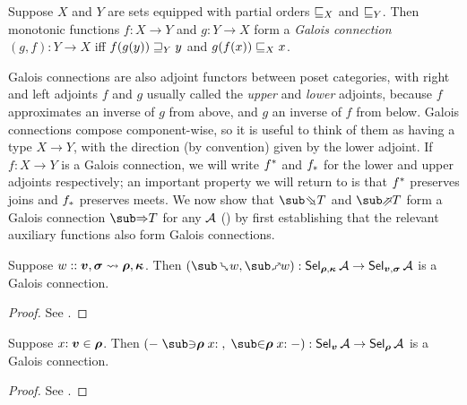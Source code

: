 \begin{definition}
   Suppose $X$ and $Y$ are sets equipped with partial orders $\numleq_X$ and $\numleq_Y$. Then monotonic functions $f: X \to Y$ and $g: Y \to X$ form a \emph{Galois connection} $(g, f): Y \to X$ iff $f(g(y)) \numgeq_Y y$ and $g(f(x)) \numleq_X x$.
\end{definition}

\noindent Galois connections are also adjoint functors between poset categories, with right and left adjoints $f$ and $g$  usually called the \emph{upper} and \emph{lower} adjoints, because $f$ approximates an inverse of $g$ from above, and $g$ an inverse of $f$ from below. Galois connections compose component-wise, so it is useful to think of them as having a type $X \to Y$, with the direction (by convention) given by the lower adjoint. If $f: X \to Y$ is a Galois connection, we will write ${f}^*$ and ${f}_*$ for the lower and upper adjoints respectively; an important property we will return to is that ${f}^*$ preserves joins and ${f}_*$ preserves meets. We now show that $\evalBwdF{T}$ and $\evalFwdF{T}$ form a Galois connection $\evalGC{T}$ for any $\mathcal{A}$ () by first establishing that the relevant auxiliary functions also form Galois connections.

\begin{theorem}
   \label{thm:core-language:match:gc}
      Suppose $w :: \bm{v}, \bm{\sigma} \rightsquigarrow \bm{\rho}, \bm{\kappa}$.  Then $(\matchBwdF{w}, \matchFwdF{w}): \Sel{\raw{\rho},\raw{\kappa}}{A} \to \Sel{\raw{v}, \raw{\sigma}}{A}$ is a Galois connection.
\end{theorem}

\begin{proof}
\ifappendices See . \else \ProofInSupplementaryMaterial \fi
\end{proof}

\begin{lemma}
\label{lem:core-language:env-get-put}Suppose $x{:}\;\bm{v}\in{\bm{\rho}}$. Then $(\envLookupBwdF{-}{\raw{\rho}}{x}{},\envLookupFwdF{}{\raw{\rho}}{x}{-}): \Sel{\raw{v}}{A} \to \Sel{\raw{\rho}}{A}$ is a Galois connection. 
\end{lemma}

\begin{proof}
   \ifappendices See . \else \ProofInSupplementaryMaterial \fi
   \end{proof}

